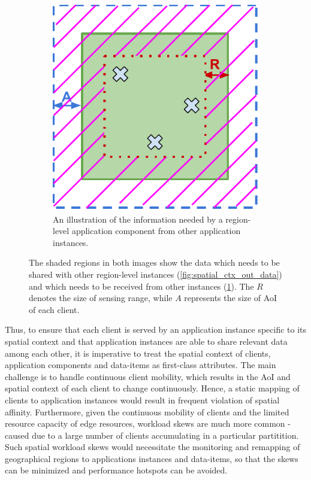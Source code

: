 \begin{figure}
\begin{subfigure}{0.4\textwidth}
  \includegraphics[width=\linewidth]{figures/mechanisms/spatial_ctx_mgmt/in_data.pdf}
  \caption{An illustration of the information needed by a region-level application component from other application instances. }
  \label{fig:spatial_ctx_in_data}
\end{subfigure}
\caption{The shaded regions in both images show the data which needs to be shared with other region-level instances (\cref{fig:spatial_ctx_out_data}) and which needs to be received from other instances (\cref{fig:spatial_ctx_in_data}). The $R$ denotes the size of sensing range, while $A$ represents the size of AoI of each client.}
\label{fig:spatial_data_sharing}
\end{figure}
Thus, to ensure that each client is served by an application instance specific to its spatial context and that application instances are able to share relevant data among each other, it is imperative to treat the spatial context of clients, application components and data-items as first-class attributes. The main challenge is to handle continuous client mobility, which results in the AoI and spatial context of each client to change continuously. Hence, a static mapping of clients to application instances would result in frequent violation of spatial affinity. Furthermore, given the continuous mobility of clients and the limited resource capacity of edge resources, workload skews are much more common - caused due to a large number of clients accumulating in a particular partitition. Such spatial workload skews would necessitate the monitoring and remapping of geographical regions to applications instances and data-items, so that the skews can be minimized and performance hotspots can be avoided.

